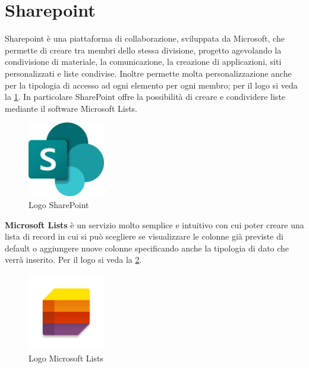 \section{Sharepoint}
Sharepoint è una piattaforma di collaborazione, sviluppata da Microsoft, che permette di creare  tra membri dello stessa divisione, progetto agevolando la condivisione di materiale, la comunicazione, la creazione di applicazioni, siti personalizzati e liste condivise.
Inoltre permette molta personalizzazione anche per la tipologia di accesso ad ogni elemento per ogni membro; per il logo si veda la \figurename \space \ref*{fig:SharePoint}. 
In particolare SharePoint offre la possibilità di creare e condividere liste mediante il software Microsoft Lists.
\begin{figure}[H]
    \centering\includegraphics[width=0.3\textwidth, height=0.3\textheight,keepaspectratio]{immagini/logo-Sharepoint.png}
    \caption{Logo SharePoint}
    \label{fig:SharePoint}
\end{figure}

\begin{description}
    \item \textbf{Microsoft Lists} è un servizio molto semplice e intuitivo con cui poter creare una lista di record in cui si può scegliere se visualizzare le colonne già previste di default o aggiungere nuove colonne specificando anche la tipologia di dato che verrà inserito. Per il logo si veda la \figurename \space \ref*{fig:M-Lists}.
\end{description}
\begin{figure}[H]
    \centering\includegraphics[width=0.3\textwidth, height=0.3\textheight,keepaspectratio]{immagini/logo-MicrosoftLists.png}
    \caption{Logo Microsoft Lists}
    \label{fig:M-Lists}
\end{figure}


